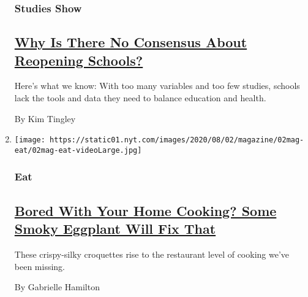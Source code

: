 \begin{enumerate}
{  \subsubsection{Studies Show}\label{studies-show}}

  \hypertarget{why-is-there-no-consensus-about-reopening-schools}{%
  \subsection{\texorpdfstring{\href{/2020/07/29/magazine/schools-reopening-covid.html}{Why
  Is There No Consensus About Reopening
  Schools?}}{Why Is There No Consensus About Reopening Schools?}}\label{why-is-there-no-consensus-about-reopening-schools}}

  Here's what we know: With too many variables and too few studies,
  schools lack the tools and data they need to balance education and
  health.

  By Kim Tingley
\item
  \texttt{[image: https://static01.nyt.com/images/2020/08/02/magazine/02mag-eat/02mag-eat-videoLarge.jpg]}

  \hypertarget{eat}{%
  \subsubsection{Eat}\label{eat}}

  \hypertarget{bored-with-your-home-cooking-some-smoky-eggplant-will-fix-that}{%
  \subsection{\texorpdfstring{\href{/2020/07/29/magazine/bored-with-your-home-cooking-some-smoky-eggplant-will-fix-that.html}{Bored
  With Your Home Cooking? Some Smoky Eggplant Will Fix
  That}}{Bored With Your Home Cooking? Some Smoky Eggplant Will Fix That}}\label{bored-with-your-home-cooking-some-smoky-eggplant-will-fix-that}}

  These crispy-silky croquettes rise to the restaurant level of cooking
  we've been missing.

  By Gabrielle Hamilton
\end{enumerate}

